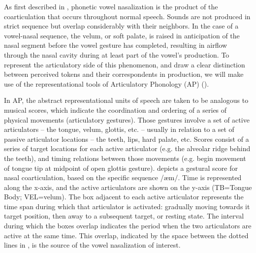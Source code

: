As first described in ,
phonetic vowel nasalization is the product of the coarticulation that
occurs throughout normal speech. Sounds are not produced in strict
sequence but overlap considerably with their neighbors. In the case
of a vowel-nasal sequence, the velum, or soft palate, is raised in
anticipation of the nasal segment before the vowel gesture has completed,
resulting in airflow through the nasal cavity during at least part
of the vowel's production. To represent the articulatory side of this
phenomenon, and draw a clear distinction between perceived tokens
and their correspondents in production, we will make use of the representational
tools of Articulatory Phonology (AP) (\citealt{Browman1986,Browman1990}). 

In AP, the abstract representational units of speech are taken to
be analogous to musical scores, which indicate the coordination and
ordering of a series of physical movements (articulatory gestures).
Those gestures involve a set of active articulators – the tongue,
velum, glottis, etc. – usually in relation to a set of passive articulator
locations – the teeth, lips, hard palate, etc. Scores consist of a
series of target locations for each active articulator (e.g. the
alveolar ridge behind the teeth), and timing relations between those
movements (e.g. begin movement of tongue tip at midpoint of open
glottis gesture).  depicts a gestural
score for nasal coarticulation, based on the specific sequence {/æm/}.
Time is represented along the x-axis, and the active articulators
are shown on the y-axis (TB=Tongue Body; VEL=velum). The box adjacent
to each active articulator represents the time span during which that
articulator is activated: gradually moving towards it target position,
then away to a subsequent target, or resting state. The interval during
which the boxes overlap indicates the period when the two articulators
are active at the same time. This overlap, indicated by the space
between the dotted lines in , is
the source of the vowel nasalization of interest. 

